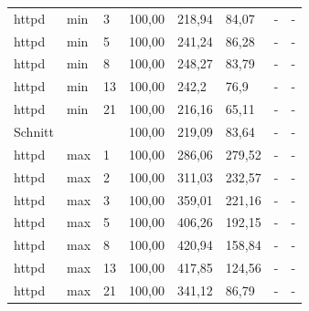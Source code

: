 \begin{footnotesize}
\begin{longtable}{llllllll}
		httpd          & min     & 3          & 100,00 & 218,94                      & 84,07                       & -                           & -                           \\
		httpd          & min     & 5          & 100,00 & 241,24                      & 86,28                       & -                           & -                           \\
		httpd          & min     & 8          & 100,00 & 248,27                      & 83,79                       & -                           & -                           \\
		httpd          & min     & 13         & 100,00 & 242,2                       & 76,9                        & -                           & -                           \\
		httpd          & min     & 21         & 100,00 & 216,16                      & 65,11                       & -                           & -                           \\ \hline
		Schnitt        &         &            & 100,00 & 219,09                      & 83,64                       & -                           & -                           \\ \hline
		httpd          & max     & 1          & 100,00 & 286,06                      & 279,52                      & -                           & -                           \\
		httpd          & max     & 2          & 100,00 & 311,03                      & 232,57                      & -                           & -                           \\
		httpd          & max     & 3          & 100,00 & 359,01                      & 221,16                      & -                           & -                           \\
		httpd          & max     & 5          & 100,00 & 406,26                      & 192,15                      & -                           & -                           \\
		httpd          & max     & 8          & 100,00 & 420,94                      & 158,84                      & -                           & -                           \\
		httpd          & max     & 13         & 100,00 & 417,85                      & 124,56                      & -                           & -                           \\
		httpd          & max     & 21         & 100,00 & 341,12                      & 86,79                       & -                           & -                           \\ \hline

\end{longtable}
\end{footnotesize}
